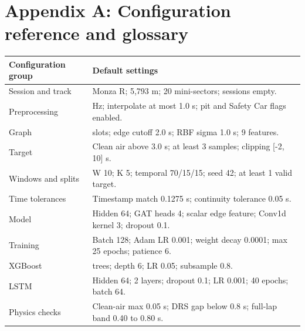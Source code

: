 \documentclass[11pt,a4paper,oneside]{report}
\begin{document}
\clearpage

\clearpage\chapter*{Appendix A: Configuration reference and glossary}


\begin{center}\small\begin{tabularx}{\textwidth}{@{}>{\raggedright\arraybackslash}X>{\raggedright\arraybackslash}X@{}}

\toprule

Configuration group & Default settings \\

\midrule

Session and track & 2023 Monza R; 5,793 m; 20 mini-sectors; sessions empty. \\

Preprocessing & 4 Hz; interpolate at most 1.0 s; pit and Safety Car flags enabled. \\

Graph & 20 slots; edge cutoff 2.0 s; RBF sigma 1.0 s; 9 features. \\

Target & Clean air above 3.0 s; at least 3 samples; clipping [-2, 10] s. \\

Windows and splits & W 10; K 5; temporal 70/15/15; seed 42; at least 1 valid target. \\

Time tolerances & Timestamp match 0.1275 s; continuity tolerance 0.05 s. \\

Model & Hidden 64; GAT heads 4; scalar edge feature; Conv1d kernel 3; dropout 0.1. \\

Training & Batch 128; Adam LR 0.001; weight decay 0.0001; max 25 epochs; patience 6. \\

XGBoost & 100 trees; depth 6; LR 0.05; subsample 0.8. \\

LSTM & Hidden 64; 2 layers; dropout 0.1; LR 0.001; 40 epochs; batch 64. \\

Physics checks & Clean-air max 0.05 s; DRS gap below 0.8 s; full-lap band 0.40 to 0.80 s. \\

\bottomrule\end{tabularx}\end{center}
\end{document}
